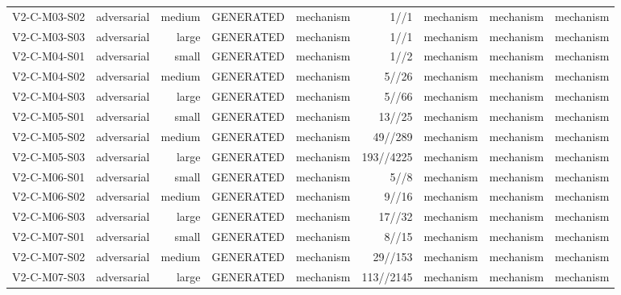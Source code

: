 {\begin{longtable}{lrrrrrrrr}
V2-C-M03-S02 & adversarial & medium & GENERATED & mechanism & 1//1 & mechanism & mechanism & mechanism \\
V2-C-M03-S03 & adversarial & large & GENERATED & mechanism & 1//1 & mechanism & mechanism & mechanism \\
V2-C-M04-S01 & adversarial & small & GENERATED & mechanism & 1//2 & mechanism & mechanism & mechanism \\
V2-C-M04-S02 & adversarial & medium & GENERATED & mechanism & 5//26 & mechanism & mechanism & mechanism \\
V2-C-M04-S03 & adversarial & large & GENERATED & mechanism & 5//66 & mechanism & mechanism & mechanism \\
V2-C-M05-S01 & adversarial & small & GENERATED & mechanism & 13//25 & mechanism & mechanism & mechanism \\
V2-C-M05-S02 & adversarial & medium & GENERATED & mechanism & 49//289 & mechanism & mechanism & mechanism \\
V2-C-M05-S03 & adversarial & large & GENERATED & mechanism & 193//4225 & mechanism & mechanism & mechanism \\
V2-C-M06-S01 & adversarial & small & GENERATED & mechanism & 5//8 & mechanism & mechanism & mechanism \\
V2-C-M06-S02 & adversarial & medium & GENERATED & mechanism & 9//16 & mechanism & mechanism & mechanism \\
V2-C-M06-S03 & adversarial & large & GENERATED & mechanism & 17//32 & mechanism & mechanism & mechanism \\
V2-C-M07-S01 & adversarial & small & GENERATED & mechanism & 8//15 & mechanism & mechanism & mechanism \\
V2-C-M07-S02 & adversarial & medium & GENERATED & mechanism & 29//153 & mechanism & mechanism & mechanism \\
V2-C-M07-S03 & adversarial & large & GENERATED & mechanism & 113//2145 & mechanism & mechanism & mechanism \\
\bottomrule
\end{longtable}
}
